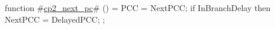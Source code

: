 function #\hyperref[sailMIPSzcp2zynextzypc]{cp2\_next\_pc}# () = {
  PCC = NextPCC;
  if InBranchDelay then {
    NextPCC = DelayedPCC;
  };
}
